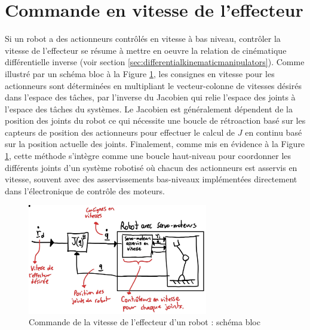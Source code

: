 \newpage
\section{Commande en vitesse de l'effecteur}
\label{sec:speedcontrol}

Si un robot a des actionneurs contrôlés en vitesse à bas niveau, contrôler la vitesse de l'effecteur se résume à mettre en oeuvre la relation de cinématique différentielle inverse (voir section \ref{sec:differentialkinematicmanipulators}).  Comme illustré par un schéma bloc à la Figure \ref{fig:robotspeedcontrol}, les consignes en vitesse pour les actionneurs sont déterminées en multipliant le vecteur-colonne de vitesses désirés dans l'espace des tâches, par l'inverse du Jacobien qui relie l'espace des joints à l'espace des tâches du systèmes. Le Jacobien est généralement dépendent de la position des joints du robot ce qui nécessite une boucle de rétroaction basé sur les capteurs de position des actionneurs pour effectuer le calcul de $J$ en continu basé sur la position actuelle des joints. Finalement, comme mis en évidence à la Figure \ref{fig:robotspeedcontrol}, cette méthode s'intègre comme une boucle haut-niveau pour coordonner les différents joints d'un système robotisé où chacun des actionneurs est asservis en vitesse, souvent avec des asservissements bas-niveaux implémentées directement dans l'électronique de contrôle des moteurs. 
\begin{figure}[H]
	\centering
		\includegraphics[width=0.7\textwidth]{fig/robotspeedcontrol.jpg}
	\caption{Commande de la vitesse de l'effecteur d'un robot : schéma bloc}
	\label{fig:robotspeedcontrol}
\end{figure}

